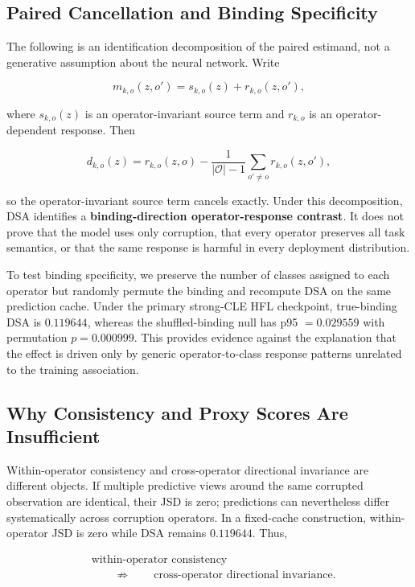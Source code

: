 \documentclass[10pt,twocolumn]{article}
\begin{document}
\subsection{Paired Cancellation and Binding Specificity}

The following is an identification decomposition of the paired estimand, not a generative assumption about the neural network. Write

\[
m_{k,o}(z,o')=s_{k,o}(z)+r_{k,o}(z,o'),
\]

where \(s_{k,o}(z)\) is an operator-invariant source term and \(r_{k,o}\) is an operator-dependent response. Then

\[
d_{k,o}(z)=r_{k,o}(z,o)
-\frac{1}{|\mathcal O|-1}\sum_{o'\neq o}r_{k,o}(z,o'),
\]

so the operator-invariant source term cancels exactly. Under this decomposition, DSA identifies a \textbf{binding-direction operator-response contrast}. It does not prove that the model uses only corruption, that every operator preserves all task semantics, or that the same response is harmful in every deployment distribution.

To test binding specificity, we preserve the number of classes assigned to each operator but randomly permute the binding and recompute DSA on the same prediction cache. Under the primary strong-CLE HFL checkpoint, true-binding DSA is \(0.119644\), whereas the shuffled-binding null has p95 \(=0.029559\) with permutation \(p=0.000999\). This provides evidence against the explanation that the effect is driven only by generic operator-to-class response patterns unrelated to the training association.

\subsection{Why Consistency and Proxy Scores Are Insufficient}

Within-operator consistency and cross-operator directional invariance are different objects. If multiple predictive views around the same corrupted observation are identical, their JSD is zero; predictions can nevertheless differ systematically across corruption operators. In a fixed-cache construction, within-operator JSD is zero while DSA remains \(0.119644\). Thus,

\[
\begin{aligned}
&\text{within-operator consistency}\\
&\qquad\not\Rightarrow\qquad
\text{cross-operator directional invariance}.
\end{aligned}
\]
\end{document}
